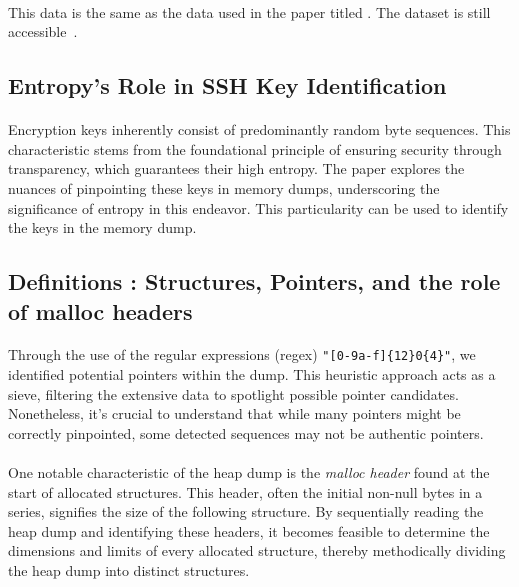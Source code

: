         \paragraph{}This data is the same as the data used in the paper titled  \cite{fellicious_smartkex_2022}. The dataset is still accessible~\cite{fellicious_machine_2022}.
     
    \subsection{Entropy's Role in SSH Key Identification}

        \paragraph{}Encryption keys\cite*{fellicious_smartkex_2022} inherently consist of predominantly random byte sequences. This characteristic stems from the foundational principle of ensuring security through transparency, which guarantees their high entropy. The paper explores the nuances of pinpointing these keys in memory dumps, underscoring the significance of entropy in this endeavor. This particularity can be used to identify the keys in the memory dump.
        
    \subsection{Definitions : Structures, Pointers, and the role of malloc headers}\label{seq:background:pointers_and_structures}
    
        \paragraph{}Through the use of the regular expressions (\acrshort{regex}) \texttt{"[0-9a-f]\{12\}0\{4\}"}, we identified potential \glspl{pointer} within the dump. This heuristic approach acts as a sieve, filtering the extensive data to spotlight possible \gls{pointer} candidates. Nonetheless, it's crucial to understand that while many \glspl{pointer} might be correctly pinpointed, some detected sequences may not be authentic \glspl{pointer}.

        \paragraph{}One notable characteristic of the heap dump is the \textit{malloc header} found at the start of allocated \glspl{structure}. This header, often the initial non-null bytes in a series, signifies the size of the following \gls{structure}. By sequentially reading the heap dump and identifying these headers, it becomes feasible to determine the dimensions and limits of every allocated \gls{structure}, thereby methodically dividing the heap dump into distinct \glspl{structure}.
        
